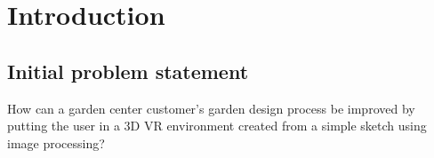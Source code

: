 \chapter{Introduction}

	\section{Initial problem statement}
	How can a garden center customer's garden design process be improved by putting the user in a 3D VR environment created from a simple sketch using image processing?
	